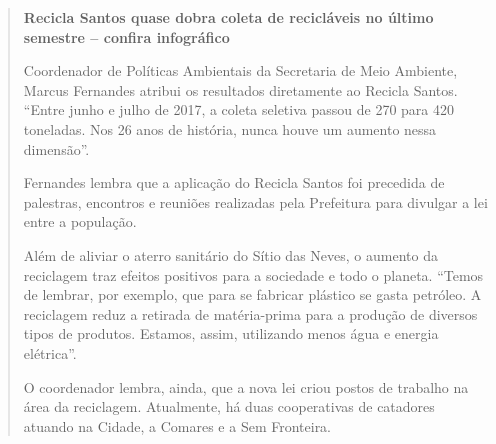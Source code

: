 \begin{quote}
\textbf{Recicla Santos quase dobra coleta de recicláveis no último
semestre -- confira infográfico}


Coordenador de Políticas Ambientais da Secretaria de Meio Ambiente,
Marcus Fernandes atribui os resultados diretamente ao Recicla Santos.
``Entre junho e julho de 2017, a coleta seletiva passou de 270 para 420
toneladas. Nos 26 anos de história, nunca houve um aumento nessa
dimensão''.

Fernandes lembra que a aplicação do Recicla Santos foi precedida de
palestras, encontros e reuniões realizadas pela Prefeitura para divulgar
a lei entre a população.

Além de aliviar o aterro sanitário do Sítio das Neves, o aumento da
reciclagem traz efeitos positivos para a sociedade e todo o planeta.
``Temos de lembrar, por exemplo, que para se fabricar plástico se gasta
petróleo. A reciclagem reduz a retirada de matéria-prima para a produção
de diversos tipos de produtos. Estamos, assim, utilizando menos água e
energia elétrica''.

O coordenador lembra, ainda, que a nova lei criou postos de trabalho na
área da reciclagem. Atualmente, há duas cooperativas de catadores
atuando na Cidade, a Comares e a Sem Fronteira.


\end{quote}

